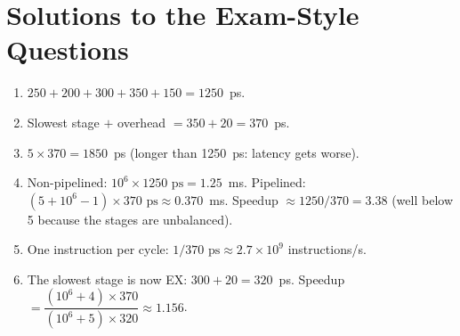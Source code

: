 \documentclass[11pt]{article}
\begin{document}
\section{Solutions to the Exam-Style Questions}

\begin{solution}[\ref{x:timing}]
\leavevmode
\begin{enumerate}[label=(\alph*),leftmargin=*]
  \item $250+200+300+350+150 = 1250$~ps.
  \item Slowest stage $+$ overhead $= 350+20 = 370$~ps.
  \item $5\times370 = 1850$~ps (longer than 1250~ps: latency gets worse).
  \item Non-pipelined: $10^6\times1250\text{ ps} = 1.25$~ms. Pipelined:
  $(5 + 10^6 - 1)\times370\text{ ps} \approx 0.370$~ms. Speedup $\approx
  1250/370 = 3.38$ (well below 5 because the stages are unbalanced).
  \item One instruction per cycle: $1/370\text{ ps} \approx 2.7\times10^9$
  instructions/s.
  \item The slowest stage is now EX: $300+20 = 320$~ps. Speedup $=
  \dfrac{(10^6+4)\times370}{(10^6+5)\times320} \approx 1.156$.
\end{enumerate}
\end{solution}
\end{document}
